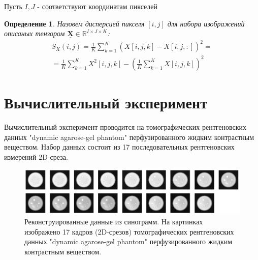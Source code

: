 \documentclass[14pt]{extarticle}
\newtheorem{definition}{Определение}
\begin{document}
Пусть $I, J$ - соответствуют координатам пикселей
\begin{definition}
    Назовем \textit{дисперсией пикселя} $[i, j]$ для набора изображений описаных тензором $\mathbf{\underline{X}} \in \mathbb{R}^{I \times J \times K}$:
    \begin{multline}
        \label{opt_transorm_f}
        S_X(i, j) = \frac{1}{K} \sum_{k=1}^K(X[i, j, k] - \overline{X}[i, j, :])^2 = \\ = \frac{1}{K} \sum_{k=1}^K X^2[i, j, k] - \left (\frac{1}{K} \sum_{k=1}^K X[i, j, k] \right )^2
    \end{multline}
\end{definition}

\section{Вычислительный эксперимент}

Вычислительный эксперимент проводится на томографических рентгеновских данных "dynamic agarose-gel phantom" перфузированного жидким контрастным веществом. Набор данных состоит из 17 последовательных рентгеновских измерений 2D-среза.

\begin{figure}[H]
        \centering
        \includegraphics[width=1\textwidth]{all_data.png}
        
        \caption{Реконструированные данные из синограмм. На картинках изображено 17 кадров (2D-срезов) томографических рентгеновских данных "dynamic agarose-gel phantom" перфузированного жидким контрастным веществом.}
        \label{fig_2}
\end{figure}
\end{document}
